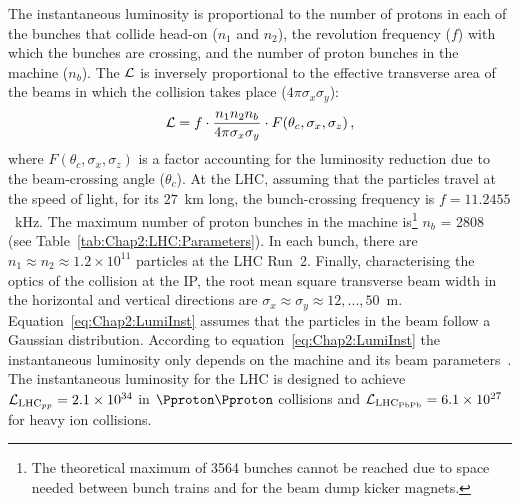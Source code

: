 
The instantaneous luminosity is proportional to the number of protons  
in each of the bunches that collide head-on ($n_1$ and $n_2$), the revolution frequency ($f$) with 
which the bunches are crossing, and the number of proton bunches in the machine ($n_b$).
The $\mathcal{L}$ is inversely proportional to the effective transverse area of the beams
in which the collision takes place ($4 \pi\sigma_{x} \sigma_{y}$):
\begin{equation}\label{eq:Chap2:LumiInst}
\mathcal{L} = f \cdot \frac{n_{1} n_{2} n_{b}}{4 \pi\sigma_{x} \sigma_{y}}\cdot F(\theta_{c},\sigma_{x},\sigma_{z})\, ,
\end{equation}
where $F(\theta_{c},\sigma_{x},\sigma_{z})$ is a factor accounting for the luminosity reduction due to the beam-crossing angle ($\theta_c$).
At the LHC, assuming that the particles travel at the speed of light, for its $27$~km long, 
the bunch-crossing frequency is $f = 11.2455$~kHz. 
The maximum number of proton bunches in the machine is\footnote{The theoretical maximum of 3564 bunches cannot 
be reached due to space needed between bunch trains and for the beam dump kicker magnets.} $n_b$ = 2808
(see Table~\ref{tab:Chap2:LHC:Parameters}). 
 In each bunch, there are $n_1 \approx n_2 \approx 1.2 \times 10^{11}$ particles at the LHC Run~2. 
 Finally, characterising the optics of the collision at the IP, the root mean square transverse beam width in the horizontal and vertical directions are $\sigma_{x} \approx \sigma_{y} \approx 12, ... , 50$~\textmu m. Equation~\ref{eq:Chap2:LumiInst} assumes that the particles in the beam follow a Gaussian distribution.
According to equation~\ref{eq:Chap2:LumiInst} the instantaneous luminosity only depends on the machine and its beam parameters~\cite{ATLAS:2016fhk}. %
The instantaneous luminosity for %
the LHC is designed to achieve $\mathcal{L}_{\text{LHC}_{pp}}=2.1\times10^{34}$\lumiunits 
in $\Pproton\Pproton$ collisions and $\mathcal{L}_{\text{LHC}_{\text{PbPb}}}=6.1\times10^{27}$\lumiunits for heavy ion collisions.
     

